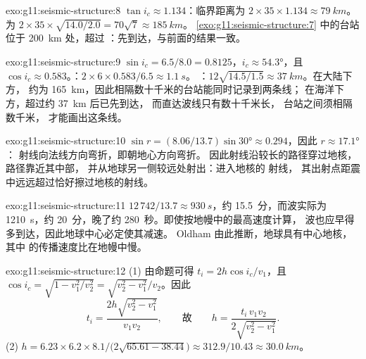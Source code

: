 \begin{solution}{exo:g11:seismic-structure:8}
$\tan i_c \approx 1.134$：临界距离为 $2 \times 35 \times 1.134
\approx \qty{79}{km}$。为 $2 \times 35 \times
\sqrt{14.0/2.0} = 70\sqrt 7 \approx \qty{185}{km}$。
\cref{exo:g11:seismic-structure:7} 中的台站位于 \qty{200}{km} 处，超过
：先到达，与前面的结果一致。
\end{solution}

\begin{solution}{exo:g11:seismic-structure:9}
$\sin i_c = 6.5/8.0 = 0.8125$，$i_c \approx \ang{54.3}$，且 $\cos i_c \approx
0.583$。：$2 \times 6 \times 0.583/6.5 \approx \qty{1.1}{s}$。
：$12\sqrt{14.5/1.5} \approx \qty{37}{km}$。在大陆下方，
约为 \qty{165}{km}，因此相隔数十千米的台站能同时记录到两条线；
在海洋下方，超过约 \qty{37}{km} 后已先到达，
而直达波线只有数十千米长，
台站之间须相隔数千米，
才能画出这条线。
\end{solution}

\begin{solution}{exo:g11:seismic-structure:10}
$\sin r = (8.06/13.7)\sin\ang{30} \approx 0.294$，因此 $r \approx \ang{17.1}$：
射线向法线方向弯折，即朝地心方向弯折。
因此射线沿较长的路径穿过地核，路径靠近其中部，
并从地球另一侧较远处射出：进入地核的 射线，
其出射点距震中远远超过恰好擦过地核的射线。
\end{solution}

\begin{solution}{exo:g11:seismic-structure:11}
$12\,742/13.7 \approx \qty{930}{s}$，约 15.5~分，而波实际为
\qty{1210}{s}，约 20~分，晚了约 280~秒。即使按地幔中的最高速度计算，
波也应早得多到达，因此地球中心必定使其减速。
Oldham 由此推断，地球具有中心地核，
其中 的传播速度比在地幔中慢。
\end{solution}

\begin{solution}{exo:g11:seismic-structure:12}
(1) 由命题可得 $t_i = 2h\cos i_c/v_1$，且 $\cos i_c = \sqrt{1 -
v_1^2/v_2^2} = \sqrt{v_2^2 - v_1^2}/v_2$。因此
\[
  t_i = \frac{2h\sqrt{v_2^2 - v_1^2}}{v_1 v_2},
  \qquad\text{故}\qquad
  h = \frac{t_i\,v_1 v_2}{2\sqrt{v_2^2 - v_1^2}}.
\]
(2) $h = 6.23 \times 6.2 \times 8.1/\bigl(2\sqrt{65.61 -
38.44}\bigr) \approx 312.9/10.43 \approx \qty{30.0}{km}$。
\end{solution}

